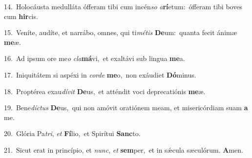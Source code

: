 {\numbfont\textcolor{\numbcolor}{14.}}~Holocáusta medulláta ófferam tibi cum incén\textit{so} \textit{a}\-\textbf{rí}etum:~\star ófferam tibi boves cum \textbf{hir}\-cis.\par
{\numbfont\textcolor{\numbcolor}{15.}}~Veníte, audíte, et narrábo, omnes, qui ti\-\textit{mé}\-\textit{tis} \textbf{De}\-um:~\star quanta fecit ánimæ \textbf{me}\-æ.\par
{\numbfont\textcolor{\numbcolor}{16.}}~Ad ipsum ore me\textit{o} \textit{cla}\-\textbf{má}vi,~\star et exaltávi sub lingua \textbf{me}\-a.\par
{\numbfont\textcolor{\numbcolor}{17.}}~Iniquitátem si aspéxi in \textit{cor}\-\textit{de} \textbf{me}\-o,~\star non exáudiet \textbf{Dó}\-minus.\par
{\numbfont\textcolor{\numbcolor}{18.}}~Proptérea exau\-\textit{dí}\-\textit{vit} \textbf{De}\-us,~\star et atténdit voci deprecatiónis \textbf{me}\-æ.\par
{\numbfont\textcolor{\numbcolor}{19.}}~Bene\-\textit{díc}\-\textit{tus} \textbf{De}\-us,~\star qui non amóvit oratiónem meam, et misericórdiam suam \textbf{a} me.\par
{\numbfont\textcolor{\numbcolor}{20.}}~Glória Pa\-\textit{tri}\-, \textit{et} \textbf{Fí}\-lio,~\star et Spirítui \textbf{Sanc}\-to.\par
{\numbfont\textcolor{\numbcolor}{21.}}~Sicut erat in princípio, et \textit{nunc}\-, \textit{et} \textbf{sem}\-per,~\star et in sǽcula sæculórum. \textbf{A}\-men.\par
